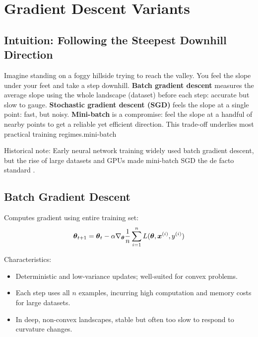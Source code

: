 
\section{Gradient Descent Variants }
\label{sec:gd-variants}

\subsection{Intuition: Following the Steepest Downhill Direction}

Imagine standing on a foggy hillside trying to reach the valley. You feel the slope under your feet and take a step downhill. \textbf{Batch gradient descent} measures the average slope using the whole landscape (dataset) before each step: accurate but slow to gauge. \textbf{Stochastic gradient descent (SGD)} feels the slope at a single point: fast, but noisy. \textbf{Mini-batch} is a compromise: feel the slope at a handful of nearby points to get a reliable yet efficient direction. This trade-off underlies most practical training regimes.\gls{mini-batch}

Historical note: Early neural network training widely used batch gradient descent, but the rise of large datasets and GPUs made mini-batch SGD the de facto standard \cite{GoodfellowEtAl2016,Prince2023}.

\subsection{Batch Gradient Descent}

Computes gradient using entire training set:
\begin{equation}
\boldsymbol{\theta}_{t+1} = \boldsymbol{\theta}_t - \alpha \nabla_{\boldsymbol{\theta}} \frac{1}{n} \sum_{i=1}^{n} L(\boldsymbol{\theta}, \boldsymbol{x}^{(i)}, y^{(i)})
\end{equation}

Characteristics:
\begin{itemize}
    \item Deterministic and low-variance updates; well-suited for convex problems.
    \item Each step uses all \(n\) examples, incurring high computation and memory costs for large datasets.
    \item In deep, non-convex landscapes, stable but often too slow to respond to curvature changes.
\end{itemize}

